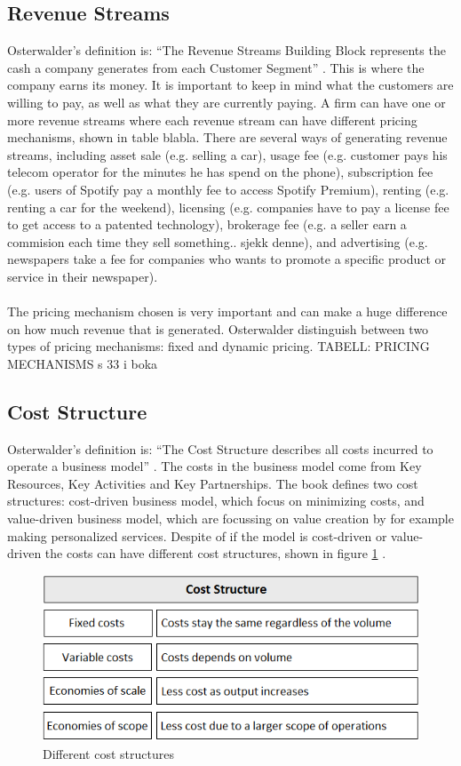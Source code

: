 \subsection{Revenue Streams}
Osterwalder’s definition is: “The Revenue Streams Building Block represents the cash a company generates from each Customer Segment” \cite{osterwalder}. This is where the company earns its money. It is important to keep in mind what the customers are willing to pay, as well as what they are currently paying. A firm can have one or more revenue streams where each revenue stream can have different pricing mechanisms, shown in table blabla. There are several ways of generating revenue streams, including asset sale (e.g. selling a car), usage fee (e.g. customer pays his telecom operator for the minutes he has spend on the phone), subscription fee (e.g. users of Spotify pay a monthly fee to access Spotify Premium), renting (e.g. renting a car for the weekend), licensing (e.g. companies have to pay a license fee to get access to a patented technology), brokerage fee (e.g. a seller earn a commision each time they sell something.. sjekk denne), and advertising (e.g. newspapers take a fee for companies who wants to promote a specific product or service in their newspaper). \\ \\ 
The pricing mechanism chosen is very important and can make a huge difference on how much revenue that is generated. Osterwalder distinguish between two types of pricing mechanisms: fixed and dynamic pricing. \cite{osterwalder}
TABELL: PRICING MECHANISMS s 33 i boka

\subsection{Cost Structure}
Osterwalder’s definition is: “The Cost Structure describes all costs incurred to operate a business model” \cite{osterwalder}. The costs in the business model come from Key Resources, Key Activities and Key Partnerships. The book \cite{osterwalder} defines two cost structures: cost-driven business model, which focus on minimizing costs, and value-driven business model, which are focussing on value creation by for example making personalized services. Despite of if the model is cost-driven or value-driven the costs can have different cost structures, shown in figure \ref{fig:CostStructure} \cite{osterwalder}.

\begin{figure}[h]
\caption[CostStructure]{Different cost structures}
\label{fig:CostStructure}
\begin{center}
\includegraphics[scale=0.8]{coststructure}
\end{center}
\end{figure}
